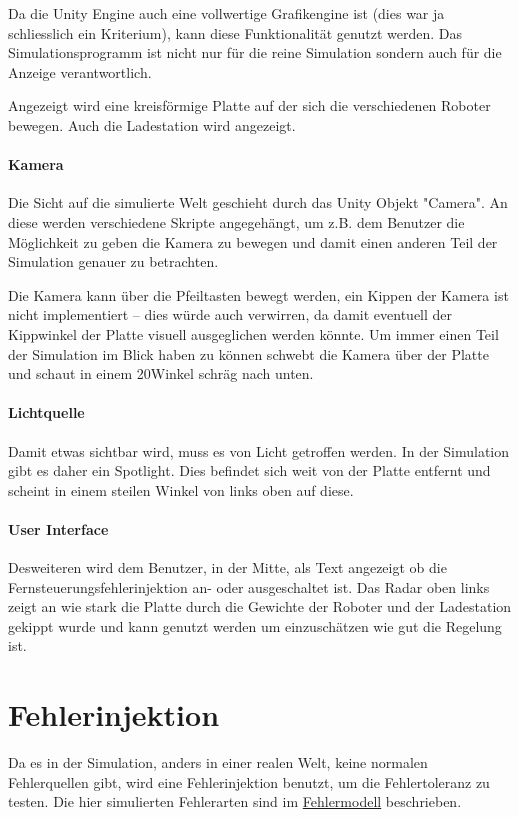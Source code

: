 Da die Unity Engine auch eine vollwertige Grafikengine ist (dies war ja schliesslich ein Kriterium),
kann diese Funktionalit{\"{a}}t genutzt werden. Das Simulationsprogramm ist nicht nur f{\"{u}}r die
reine Simulation sondern auch f{\"{u}}r die Anzeige verantwortlich.

Angezeigt wird eine kreisf{\"{o}}rmige Platte auf der sich die verschiedenen Roboter bewegen. Auch die
Ladestation wird angezeigt.

\paragraph{Kamera} Die Sicht auf die simulierte Welt geschieht durch das Unity Objekt "Camera". An diese
werden verschiedene Skripte angegeh{\"{a}}ngt, um z.B. dem Benutzer die M{\"{o}}glichkeit zu
geben die Kamera zu bewegen und damit einen anderen Teil der Simulation genauer zu betrachten.

Die Kamera kann {\"{u}}ber die Pfeiltasten bewegt werden, ein Kippen der Kamera ist nicht implementiert --
dies w{\"{u}}rde auch verwirren, da damit eventuell der Kippwinkel der Platte visuell ausgeglichen
werden k{\"{o}}nnte. Um immer einen Teil der Simulation im Blick haben zu k{\"{o}}nnen schwebt die Kamera
{\"{u}}ber der Platte und schaut in einem 20\textdegree Winkel schr{\"{a}}g nach unten.

\paragraph{Lichtquelle} Damit etwas sichtbar wird, muss es von Licht getroffen werden. In der Simulation
gibt es daher ein Spotlight. Dies befindet sich weit von der Platte entfernt und scheint in einem steilen Winkel
von links oben auf diese.

\paragraph{User Interface} Desweiteren wird dem Benutzer, in der Mitte, als Text angezeigt ob die
Fernsteuerungsfehlerinjektion an- oder ausgeschaltet ist. Das Radar oben links zeigt an wie stark die Platte
durch die Gewichte der Roboter und der Ladestation gekippt wurde und kann genutzt werden um einzusch{\"{a}}tzen
wie gut die Regelung ist.



\clearpage
\section{Fehlerinjektion}
Da es in der Simulation, anders in einer realen Welt, keine normalen Fehlerquellen gibt, wird eine
Fehlerinjektion benutzt, um die Fehlertoleranz zu testen. Die hier simulierten Fehlerarten 
sind im \hyperref[fm]{Fehlermodell} beschrieben.

